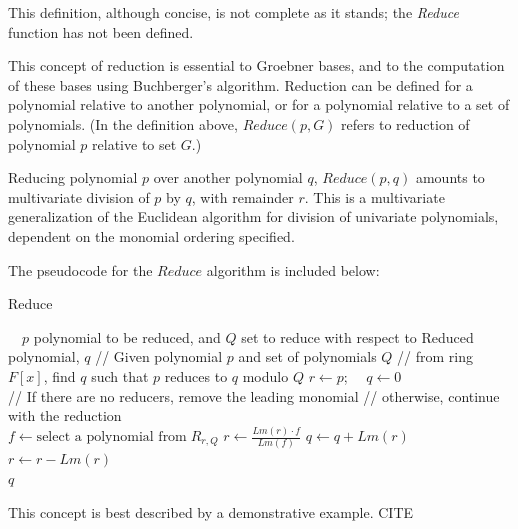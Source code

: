 \documentclass[letterpaper,12pt,titlepage,oneside,final]{book}
\begin{document}
This definition, although concise, is not complete as it stands; the \textit{Reduce} function has not been defined.

This concept of reduction is essential to Groebner bases, and to the computation of these bases using Buchberger's algorithm.  Reduction can be defined for a polynomial relative to another polynomial, or for a polynomial relative to a set of polynomials.  (In the definition above, ${Reduce( p, G)}$ refers to reduction of polynomial ${p}$ relative to set ${G}$.)  

Reducing polynomial ${p}$ over another polynomial ${q}$, ${Reduce( p, q)}$ amounts to multivariate division of ${p}$ by ${q}$, with remainder ${r}$.  This is a multivariate generalization of the Euclidean algorithm for division of univariate polynomials, dependent on the monomial ordering specified.  

The pseudocode for the ${Reduce}$ algorithm is included below:
\begin{algorithm}[H]
\caption{Reduce}\label{reduce}
\begin{algorithmic}[1]
\Input $\quad p$ polynomial to be reduced, and ${Q}$ set to reduce with respect to
\Output Reduced polynomial, ${q}$
\State // Given polynomial ${p}$ and set of polynomials ${Q}$
\State // from ring ${F[x]}$, find ${q}$ such that ${p}$ reduces to ${q}$ modulo ${Q}$
\State $r \gets p$; $\quad q \gets 0$ \\
\State // If there are no reducers, remove the leading monomial
\State // otherwise, continue with the reduction\\
    \State $f \gets \textrm{select a polynomial from}\; R_{r,Q}$
    \State $r \gets \frac{Lm(r) \cdot f}{Lm(f)}$
  \EndWhile
  \State $q \gets q + Lm(r)$
  \State $r \gets r - Lm(r)$
\EndWhile\\
\Return $q$
\EndProcedure
\end{algorithmic}
\end{algorithm}  

This concept is best described by a demonstrative example. CITE
\end{document}
